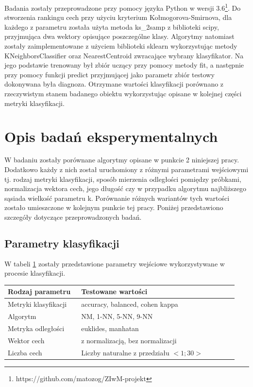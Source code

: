 \documentclass[12pt]{article}
\begin{document}
\indent Badania zostały przeprowadzone przy pomocy języka Python w wersji 3.6\footnote{https://github.com/matozog/ZIwM-projekt}. Do stworzenia rankingu cech przy użyciu kryterium Kołmogorova-Smirnova, dla każdego z parametru została użyta metoda ks\_2samp z biblioteki scipy, przyjmująca dwa wektory opisujące poszczególne klasy. Algorytmy natomiast zostały zaimplementowane z użyciem biblioteki sklearn wykorzystując metody KNeighborsClassifier oraz NearestCentroid zwracające wybrany klasyfikator. Na jego podstawie trenowany był zbiór uczący przy pomocy metody fit, a następnie przy pomocy funkcji predict przyjmującej jako parametr zbiór testowy dokonywana była diagnoza. Otrzymane wartości klasyfikacji porównano z rzeczywistym stanem badanego obiektu wykorzystując opisane w kolejnej części metryki klasyfikacji.


\section{Opis badań eksperymentalnych}
\indent W badaniu zostały porównane algorytmy opisane w punkcie 2 niniejszej pracy. Dodatkowo każdy z nich został uruchomiony z różnymi parametrami wejściowymi tj. rodzaj metryki klasyfikacji, sposób mierzenia odległości pomiędzy próbkami, normalizacja wektora cech, jego długość czy w przypadku algorytmu najbliższego sąsiada wielkość parametru k. Porównanie różnych wariantów tych wartości zostało umieszczone w kolejnym punkcie tej pracy. Poniżej przedstawiono szczegóły dotyczące przeprowadzonych badań.\\

\subsection{Parametry klasyfikacji}
W tabeli \ref{parametry_klasyfiacji} zostały przedstawione parametry wejściowe wykorzystywane w procesie klasyfikacji.
\begin{table}[H]
\label{parametry_klasyfiacji}
	\begin{tabular}{|p{0.3\linewidth}|p{0.64\linewidth}|}%
	\hline\centering
	Rodzaj parametru 	& Testowane wartości 		\\ \hline\centering
	Metryki klasyfikacji	& accuracy, balanced, cohen kappa \\ \hline\centering
	Algorytm	& NM, 1-NN, 5-NN, 9-NN \\ \hline\centering
	Metryka odległości	& euklides, manhatan \\ \hline\centering
	Wektor cech	& z normalizacją, bez normalizacji \\ \hline\centering
	Liczba cech	& Liczby naturalne z przedziału $<1;30>$ \\ \hline
	\end{tabular}
\end{table}
\end{document}
